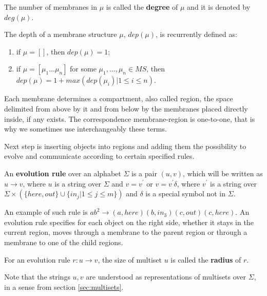 \begin{definition}
  The number of membranes in $\mu$ is called the {\bf degree} of $\mu$ and it is denoted by $deg(\mu)$.
\end{definition}

\begin{definition}
  The depth of a membrane structure $\mu$, $dep(\mu)$, is recurrently defined as:
  \begin{enumerate}
    \item if $\mu = []$, then $dep(\mu) = 1$;
    \item if $\mu = [\mu_1\ldots\mu_n]$ for some $\mu_1, \ldots, \mu_n\in MS$, then $dep(\mu) = 1 + max(dep(\mu_i) | 1\leq i\leq n)$.
  \end{enumerate}
\end{definition}

Each membrane determines a compartment, also called region, the space delimited from above by it and from below by the membranes placed directly inside, if any exists. The correspondence membrane-region is one-to-one, that is why we sometimes use interchangeably these terms.


Next step is inserting objects into regions and adding them the possibility to evolve and communicate according to certain specified rules.

\begin{definition}
\label{def:evolution_rule}
  An {\bf evolution rule} over an alphabet $\Sigma$ is a pair $(u,v)$, which will be written as $u\rightarrow v$, where $u$ is a string over $\Sigma$ and $v=v^\prime$ or $v=v^\prime\delta$, where $v^\prime$ is a string over $\Sigma\times(\{here, out\}\cup\{in_j|1\leq j\leq m\})$ and $\delta$ is a special symbol not in $\Sigma$.
\end{definition}

An example of such rule is $ab^2\rightarrow (a,here)(b,in_3)(c,out)(c,here)$. An evolution rule specifies for each object on the right side, whether it stays in the current region, moves through a membrane to the parent region or through a membrane to one of the child regions.

\begin{definition}
  For an evolution rule $r: u\rightarrow v$, the size of multiset $u$ is called the {\bf radius} of $r$.
\end{definition}

Note that the strings $u, v$ are understood as representations of multisets over $\Sigma$, in a sense from section \ref{sec:multisets}.


